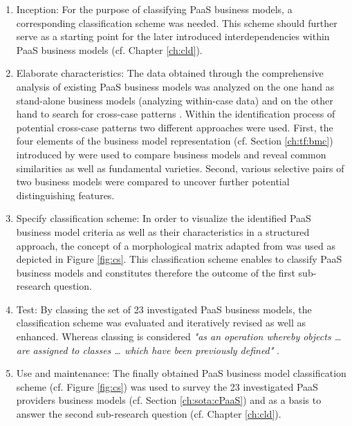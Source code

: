 \begin{enumerate}
	\item Inception: For the purpose of classifying \ac{PaaS} business models, a corresponding classification scheme was needed. This scheme should further serve as a starting point for the later introduced interdependencies within \ac{PaaS} business models (cf. Chapter \ref{ch:cld}).

	\item Elaborate characteristics: The data obtained through the comprehensive analysis of existing \ac{PaaS} business models was analyzed on the one hand as stand-alone business models (analyzing within-case data) and on the other hand to search for cross-case patterns \citep[pp. 539-540]{Eisenhardt1989}. Within the identification process of potential cross-case patterns two different approaches were used. First, the four elements of the business model representation (cf. Section \ref{ch:tf:bmc}) introduced by \citet{Johnson2008} were used to compare business models and reveal common similarities as well as fundamental varieties. Second, various selective pairs of two business models were compared to uncover further potential distinguishing features. 

	\item Specify classification scheme: In order to visualize the identified \ac{PaaS} business model criteria as well as their characteristics in a structured approach, the concept of a morphological matrix adapted from \citet{ Zwicky1969} was used as depicted in Figure \ref{fig:cs}. This classification scheme enables to classify \ac{PaaS} business models and constitutes therefore the outcome of the first sub-research question.

	\item Test: By classing the set of 23 investigated \ac{PaaS} business models, the classification scheme was evaluated and iteratively revised as well as enhanced. Whereas classing is considered \textit{"as an operation whereby objects \ldots\xspace are assigned to classes \ldots\xspace which have been previously defined"} \citep[p. 130]{Marradi1990}.

	\item Use and maintenance: The finally obtained \ac{PaaS} business model classification scheme (cf. Figure \ref{fig:cs}) was used to survey the 23 investigated \ac{PaaS} providers business models (cf. Section \ref{ch:sota:cPaaS}) and as a basis to answer the second sub-research question (cf. Chapter \ref{ch:cld}).
\end{enumerate}

